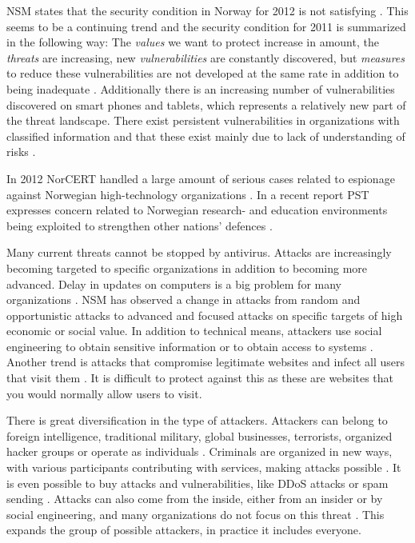 \acs{NSM} states that the security condition in Norway for 2012 is not satisfying \cite{samordnaVurdering}. This seems to be a continuing trend and the security condition for 2011 is summarized in the following way: The \textit{values} we want to protect increase in amount, the \textit{threats} are increasing, new \textit{vulnerabilities} are constantly discovered, but \textit{measures} to reduce these vulnerabilities are not developed at the same rate in addition to being inadequate \cite{NSMRapport}. Additionally there is an increasing number of vulnerabilities discovered on smart phones and tablets, which represents a relatively new part of the threat landscape. There exist persistent vulnerabilities in organizations with classified information and that these exist mainly due to lack of understanding of risks \cite{NSMRapport2012}.

In 2012 \acs{NorCERT} handled a large amount of serious cases related to espionage against Norwegian high-technology organizations \cite{NorCERT3Kvartal2012}. In a recent report PST expresses concern related to Norwegian research- and education environments being exploited to strengthen other nations' defences \cite{PSTvurdering2013}.   

Many current threats cannot be stopped by antivirus. Attacks are increasingly becoming targeted to specific organizations in addition to becoming more advanced. Delay in updates on computers is a big problem for many organizations \cite{NorCERT2Kvartal2012}. \acs{NSM} has observed a change in attacks from random and opportunistic attacks to advanced and focused attacks on specific targets of high economic or social value. In addition to technical means, attackers use social engineering to obtain sensitive information or to obtain access to systems \cite{NSMRapport}. Another trend is attacks that compromise legitimate websites and infect all users that visit them \cite{NSMRapport2012}. It is difficult to protect against this as these are websites that you would normally allow users to visit.

There is great diversification in the type of attackers. Attackers can belong to foreign intelligence, traditional military, global businesses, terrorists, organized hacker groups or operate as individuals \cite{samordnaVurdering}. Criminals are organized in new ways, with various participants contributing with services, making attacks possible \cite{KriposTrender}. It is even possible to buy attacks and vulnerabilities, like \ac{DDoS} attacks or spam sending \cite{NorCERT2Kvartal2012}. Attacks can also come from the inside, either from an insider or by social engineering, and many organizations do not focus on this threat \cite{NSMRapport2012}. This expands the group of possible attackers, in practice it includes everyone. 

